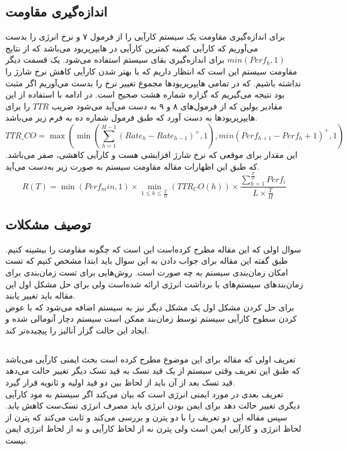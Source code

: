 \documentclass[a4paper, 11pt]{article}
\begin{document}
\subsection{اندازه‌گیری مقاومت}
برای اندازه‌گیری مقاومت یک سیستم کارآیی را از فرمول ۷ و نرخ انرژی را بدست می‌آوریم که
کارآیی کمینه کمترین کارآیی در هایپرپریود می‌باشد که از نتایج
$min(Perf_h,1)$
برای اندازه‌گیری بقای سیستم استفاده می‌شود.
یک قسمت دیگر مقاومت سیستم این است که انتظار داریم که با بهتر شدن کارآیی کاهش نرخ شارژ را
نداشته باشیم. که در تمامی هایپرپریود‌ها مجموع تغییر نرخ را بدست می‌آوریم اگر مثبت بود نتیجه
می‌گیریم که گزاره شماره هشت صحیح است.
در ادامه با استفاده از این مقادیر بولین که از فرمول‌های ۸ و ۹ به دست می‌آید می‌شود
ضریب
$TTR$
را برای هایپرپریود‌ها به دست آورد که طبق فرمول شماره ده به فرم زیر می‌باشد. \\
\begin{equation}
    TTR\_CO = \max(\min(\sum_{h=1}^{H-1}(Rate_h-Rate_{h-1})^+,1),
min(Perf_{h+1}-Perf_h+1)^+,1)
\end{equation}
این مقدار برای موقعی که نرخ شارژ افزایشی هست و کارآیی کاهشی، صفر می‌باشد.
که طبق این اظهارات مقاله مقاومت سیستم به صورت زیر به‌دست می‌آید. \\
\begin{equation}
    R(T) = \min(Perf_min,1) \times \min\limits_{1 \le h \le \frac{T}{\Pi}}
(TTR_CO(h)) \times \frac{\sum_{h=1}^{\frac{T}{\Pi}}Perf_i}
{L \times \frac{T}{\Pi}}
\end{equation}

\subsection{توصیف مشکلات}
سوال اولی که این مقاله مطرح کرده‌است این است که چگونه مقاومت را بیشینه کنیم.
طبق گفته این مقاله برای جواب دادن به این سوال باید ابتدا مشخص کنیم که تست امکان زمان‌بندی
سیستم به چه صورت است. روش‌هایی برای تست زمان‌بندی برای زمان‌بند‌های سیستم‌های با برداشت
انرژی ارائه شده‌است ولی برای حل مشکل اول این مقاله باید تغییر‌ یابند. \\
برای حل کردن مشکل اول یک مشکل دیگر نیز به سیستم اضافه می‌شود که با عوض کردن سطوح
کارآیی سیستم توسط زمان‌بند ممکن است سیستم دچار آنومالی شده و ایجاد این حالت گزار آنالیز را
پیچیده‌تر کند.
\subsection{}
تعریف اولی که مقاله برای این موضوع مطرح کرده است بحث ایمنی کارآیی می‌باشد که
طبق این تعریف وقتی سیستم از یک قید تسک به قید تسک دیگر تغییر حالت می‌دهد قید تسک 
بعد از آن باید از لحاظ
بین دو قید اولیه و ثانویه قرار گیرد. \\
تعریف بعدی در مورد ایمنی انرژی است که بیان می‌کند اگر سیستم به مود کارآیی دیگری تغییر حالت دهد
برای ایمن بودن انرژی باید مصرف انرژی تسک‌ست کاهش یابد.
سپس مقاله این دو تعریف را با دو پترن
و
بررسی می‌کند و ثابت می‌کند که پترن
از لحاظ انرژی و کارآیی ایمن است ولی پترن
نه از لحاظ کارآیی و نه از لحاظ انرژی ایمن نیست.
\end{document}
